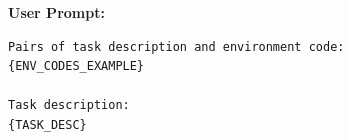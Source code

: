 \textbf{User Prompt:}
\begin{lstlisting}[language={}]
Pairs of task description and environment code:
{ENV_CODES_EXAMPLE}

Task description:
{TASK_DESC}
\end{lstlisting}

